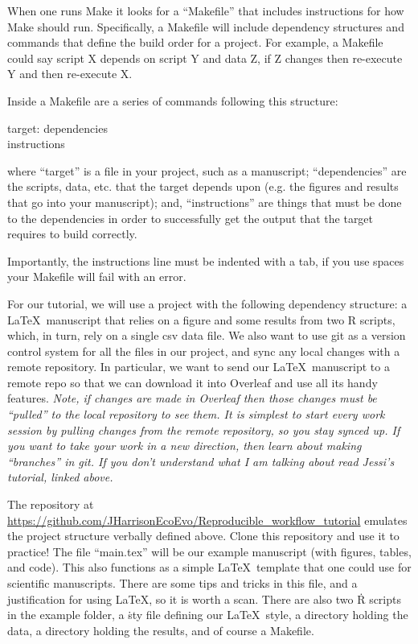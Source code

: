 \documentclass{article}
\begin{document}
When one runs {\sf Make} it looks for a ``Makefile'' that includes instructions for how {\sf Make} should run. Specifically, a Makefile will include dependency structures and commands that define the build order for a project. For example, a Makefile could say script X depends on script Y and data Z, if Z changes then re-execute Y and then re-execute X. 

Inside a Makefile are a series of commands following this structure: 

\begin{center}
target: dependencies\\
\indent instructions
\end{center}

\noindent where ``target'' is a file in your project, such as a manuscript; ``dependencies'' are the scripts, data, etc. that the target depends upon (e.g. the figures and results that go into your manuscript); and, ``instructions'' are things that must be done to the dependencies in order to successfully get the output that the target requires to build correctly. 

Importantly, the instructions line must be indented with a tab, if you use spaces your Makefile will fail with an error.

For our tutorial, we will use a project with the following dependency structure: a \LaTeX\ manuscript that relies on a figure and some results from two {\sf R} scripts, which, in turn, rely on a single csv data file. We also want to use {\sf git} as a version control system for all the files in our project, and sync any local changes with a remote repository. In particular, we want to send our \LaTeX\ manuscript to a remote repo so that we can download it into {\sf Overleaf} and use all its handy features. \emph{Note, if changes are made in Overleaf then those changes must be ``pulled'' to the local repository to see them. It is simplest to start every work session by pulling changes from the remote repository, so you stay synced up. If you want to take your work in a new direction, then learn about making ``branches'' in {\sf git}. If you don't understand what I am talking about read Jessi's tutorial, linked above.}   

The repository at \url{https://github.com/JHarrisonEcoEvo/Reproducible_workflow_tutorial} emulates the project structure verbally defined above. Clone this repository and use it to practice! The file ``main.tex'' will be our example manuscript (with figures, tables, and code). This also functions as a simple \LaTeX\ template that one could use for scientific manuscripts. There are some tips and tricks in this file, and a justification for using \LaTeX, so it is worth a scan. There are also two \.R scripts in the example folder, a \.sty file defining our \LaTeX\ style, a directory holding the data, a directory holding the results, and of course a Makefile. 
\end{document}
